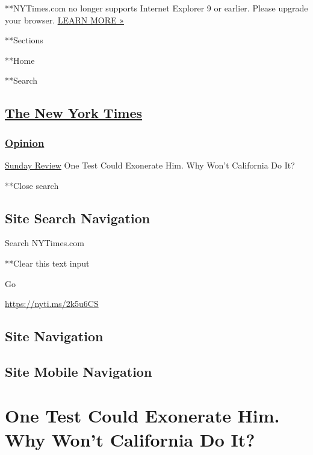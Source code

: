  **NYTimes.com no longer supports Internet Explorer 9 or earlier. Please
upgrade your browser.
\href{http://www.nytimes3xbfgragh.onion/content/help/site/ie9-support.html}{LEARN
MORE »}

**Sections

**Home

**Search

\hypertarget{the-new-york-times}{%
\subsection{\texorpdfstring{\href{http://www.nytimes3xbfgragh.onion/}{The
New York Times}}{The New York Times}}\label{the-new-york-times}}

\hypertarget{-opinion-}{%
\subsubsection{\texorpdfstring{ \href{/section/opinion}{Opinion}
}{ Opinion }}\label{-opinion-}}

 \href{https://www.nytimes3xbfgragh.onion/section/opinion/sunday}{Sunday
Review} \textbar{}One Test Could Exonerate Him. Why Won't California Do
It?

**Close search

\hypertarget{site-search-navigation}{%
\subsection{Site Search Navigation}\label{site-search-navigation}}

Search NYTimes.com

**Clear this text input

Go

\url{https://nyti.ms/2k5u6CS}

\hypertarget{site-navigation}{%
\subsection{Site Navigation}\label{site-navigation}}

\hypertarget{site-mobile-navigation}{%
\subsection{Site Mobile Navigation}\label{site-mobile-navigation}}

\hypertarget{one-test-could-exonerate-him-why-wont-california-do-it}{%
\section{One Test Could Exonerate Him. Why Won't California Do
It?}\label{one-test-could-exonerate-him-why-wont-california-do-it}}

